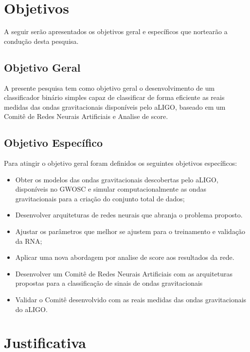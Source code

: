 \section{Objetivos}
\label{sec:objetivos}

A seguir serão apresentados os objetivos geral e específicos que nortearão a condução desta pesquisa.

\subsection{Objetivo Geral}
\label{sec:objetivo-geral}

A presente pesquisa tem como objetivo geral o desenvolvimento de um classificador binário simples capaz de classificar de forma eficiente as reais medidas das ondas gravitacionais disponíveis pelo aLIGO, baseado em um Comitê de Redes Neurais Artificiais e Analise de score.

\subsection{Objetivo Específico}
\label{sec:objetivo-especifico}

Para atingir o objetivo geral foram definidos os seguintes objetivos específicos: 
\begin{itemize}

\item Obter os modelos das ondas gravitacionais descobertas pelo aLIGO, disponíveis no GWOSC \cite{vallisneri2015ligo} e simular computacionalmente as ondas gravitacionais para a criação do conjunto total de dados;
\item Desenvolver arquiteturas de redes neurais que abranja o problema proposto.
\item Ajustar os parâmetros que melhor se ajustem para o treinamento e validação da RNA;
\item Aplicar uma nova abordagem por analise de score aos resultados da rede. 
\item Desenvolver um Comitê de Redes Neurais Artificiais com as arquiteturas propostas para a classificação de sinais de ondas gravitacionais
\item Validar o Comitê desenvolvido com as reais medidas das ondas gravitacionais do aLIGO.

\end{itemize}

\section{Justificativa}
\label{sec:justificativa}


